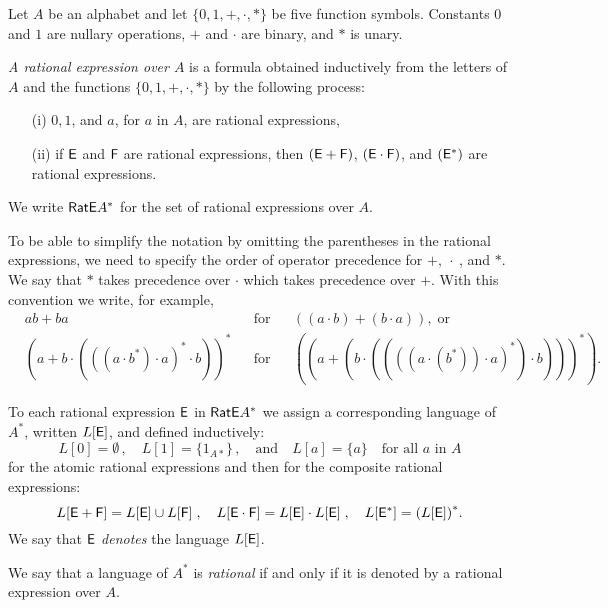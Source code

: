 Let $A$ be an alphabet and let $\{0, 1, +, \cdot, *\}$ be five function symbols. Constants $0$ and $1$ are nullary operations, $+$ and $\cdot$ are binary, and $*$ is unary.

\begin{defn}
    \emph{A rational expression over $A$} is a formula obtained inductively from the letters of $A$ and the functions $\{0, 1, +, \cdot, *\}$ by the following process:
    \begin{itemize}
        \item[(i)] $0, 1$, and $a$, for $a$ in $A$, are rational expressions,
        \item[(ii)] if ${\mathsf{E}}$ and ${\mathsf{F}}$ are rational expressions, then $({\mathsf{E}} + {\mathsf{F}})$, $({\mathsf{E}} \cdot {\mathsf{F}})$, and $({\mathsf{E}}^*)$ are rational expressions.
    \end{itemize}
    We write ${\mathsf{RatE}} A^*$ for the set of rational expressions over $A$.
\end{defn}

To be able to simplify the notation by omitting the parentheses in the rational expressions, we need to specify the order of operator precedence for $+, \: \cdot \:$, and $*$. We say that $*$ takes precedence over $\cdot$ which takes precedence over $+$. With this convention we write, for example,
\begin{align*}
    &ab + ba & &\text{for} & &((a \cdot b) + (b \cdot a)), \; \text{or}\\
    &{(a + b \cdot ({((a \cdot b^* ) \cdot a)}^* \cdot b))}^* & &\text{for} & &({(a + (b \cdot (({((a \cdot (b^*)) \cdot a)}^* ) \cdot b)))}^* ) .
\end{align*}

\begin{defn}
    To each rational expression ${\mathsf{E}}$ in ${\mathsf{RatE}} A^*$ we assign a corresponding language of $A^*$, written $L[{\mathsf{E}}]$, and defined inductively:
    \[
            L[0] = \emptyset \, , \quad L[1] = \{1_{A*}\} \, , \quad \text{and} \quad L[a] = \{a\} \quad \text{for all $a$ in $A$}
    \]
    for the atomic rational expressions and then for the composite rational expressions:
    \[
        L[{\mathsf{E}} + {\mathsf{F}}] = L[{\mathsf{E}}] \cup L[{\mathsf{F}}] \; , \quad L[{\mathsf{E}} \cdot {\mathsf{F}}] = L[{\mathsf{E}}] \cdot L[{\mathsf{E}}] \; , \quad L[{\mathsf{E}}^*] = {(L[{\mathsf{E}}])}^*.
    \]
    We say that ${\mathsf{E}}$ \emph{denotes} the language $L[{\mathsf{E}}]$.
\end{defn}

We say that a language of $A^*$ is \emph{rational} if and only if it is denoted by a rational expression over $A$.

